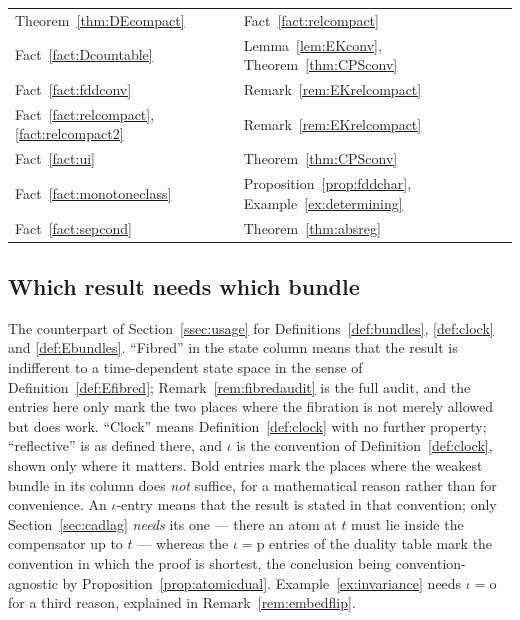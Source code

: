 \documentclass[11pt,a4paper]{article}
\theoremstyle{plain}
\theoremstyle{definition}
\theoremstyle{remark}
\begin{document}
\begin{tabular}{@{}ll@{}}
Theorem~\ref{thm:DEcompact}
  & Fact~\ref{fact:relcompact} \\
Fact~\ref{fact:Dcountable}
  & Lemma~\ref{lem:EKconv}, Theorem~\ref{thm:CPSconv} \\
Fact~\ref{fact:fddconv}
  & Remark~\ref{rem:EKrelcompact} \\
Fact~\ref{fact:relcompact}, \ref{fact:relcompact2}
  & Remark~\ref{rem:EKrelcompact} \\
Fact~\ref{fact:ui}
  & Theorem~\ref{thm:CPSconv} \\
Fact~\ref{fact:monotoneclass}
  & Proposition~\ref{prop:fddchar}, Example~\ref{ex:determining} \\
Fact~\ref{fact:sepcond}
  & Theorem~\ref{thm:absreg} \\
\bottomrule
\end{tabular}

\subsection{Which result needs which bundle}
\label{ssec:bundletable}

\noindent
The counterpart of Section~\ref{ssec:usage} for
Definitions~\ref{def:bundles}, \ref{def:clock} and \ref{def:Ebundles}.
``Fibred'' in the state column means that the result is indifferent to a
time-dependent state space in the sense of Definition~\ref{def:Efibred};
Remark~\ref{rem:fibredaudit} is the full audit, and the entries here only mark
the two places where the fibration is not merely allowed but does work.
``Clock'' means Definition~\ref{def:clock} with no further property;
``reflective'' is as defined there, and $\iota$ is the convention of
Definition~\ref{def:clock}, shown only where it matters.  Bold entries mark the
places where the weakest bundle in its column does \emph{not} suffice, for a
mathematical reason rather than for convenience.  An $\iota$-entry means that the
result is stated in that convention; only Section~\ref{sec:cadlag} \emph{needs}
its one --- there an atom at $t$ must lie inside the compensator up to $t$ ---
whereas the $\iota = \mathrm{p}$ entries of the duality table mark the convention
in which the proof is shortest, the conclusion being convention-agnostic by
Proposition~\ref{prop:atomicdual}.  Example~\ref{ex:invariance} needs
$\iota = \mathrm{o}$ for a third reason, explained in
Remark~\ref{rem:embedflip}.
\end{document}
